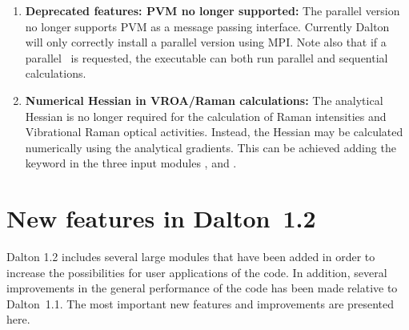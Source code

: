 \begin{enumerate}
\item{\bf Deprecated features: PVM no longer supported:} The parallel
  version no longer supports PVM as a message passing
  interface. Currently Dalton will only correctly install a parallel
  version using MPI. Note also that if a parallel \dalton\ is
  requested, the executable can both run parallel and sequential
  calculations.
%
\item{\bf Numerical Hessian in VROA/Raman calculations:} The
  analytical Hessian is no longer required for the calculation of
  Raman intensities and Vibrational Raman optical activities. Instead,
  the Hessian may be calculated numerically using the analytical
  gradients. This can be achieved adding the keyword  in
  the three input modules ,  and .

\end{enumerate}

\section{New features in Dalton~1.2}
Dalton 1.2 includes several large modules that have been added in order
to increase the possibilities for user applications of the code. In
addition, several improvements in the general performance of the code
has been made relative to Dalton~1.1. The most important new features
and improvements are presented here.

